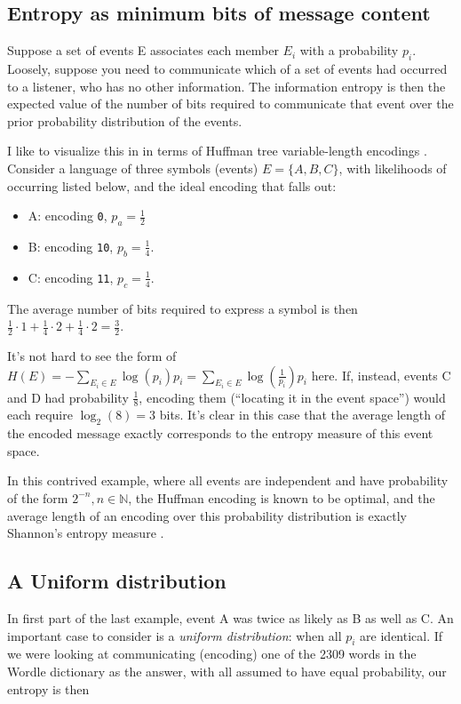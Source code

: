 \documentclass[11pt, oneside]{article} 	%
\begin{document}
\subsection{Entropy as minimum bits of message content}

Suppose a set of events E associates each member $E_i$ with a probability $p_i$. Loosely, suppose you need to communicate which of a set of events had occurred to a listener, who has no other information. The information entropy is then the expected value of the number of bits required to communicate that event over the prior probability distribution of the events.

I like to visualize this in in terms of Huffman tree variable-length encodings \cite{4}. Consider a language of three symbols (events) $E = \{A, B, C\}$, with likelihoods of occurring listed below, and the ideal encoding that falls out:

\begin{itemize}
\item A: encoding \texttt{0}, $p_a = \frac{1}{2}$
\item B: encoding \texttt{10}, $p_b = \frac{1}{4}$.
\item C: encoding \texttt{11}, $p_c = \frac{1}{4}$.
\end{itemize}

The average number of bits required to express a symbol is then 
$\frac{1}{2} \cdot 1 + \frac{1}{4} \cdot 2 + \frac{1}{4} \cdot 2 =\frac{3}{2}$.

It's not hard to see the form of $H(E) = -\sum_{E_i \in E} \log(p_i)p_i = \sum_{E_i \in E} \log(\frac{1}{p_i}) p_i$ here. If, instead, events C and D had probability $\frac{1}{8}$, encoding them (``locating it in the event space'') would each require $\log_2(8) = 3$ bits. It's clear in this case that the average length of the encoded message exactly corresponds to the entropy measure of this event space.

In this contrived example, where all events are independent and have probability of the form $2^{-n}, n \in \mathbb{N}$, the Huffman encoding is known to be optimal, and the average length of an encoding over this probability distribution is exactly Shannon's entropy measure \cite{4}.
 
\subsection{A Uniform distribution}

In first part of the last example, event A was twice as likely as B as well as C. An important case to consider is a \emph{uniform distribution}: when all $p_i$ are identical. If we were looking at communicating (encoding) one of the 2309 words in the Wordle dictionary as the answer, with all assumed to have equal probability, our entropy is then 
\end{document}
